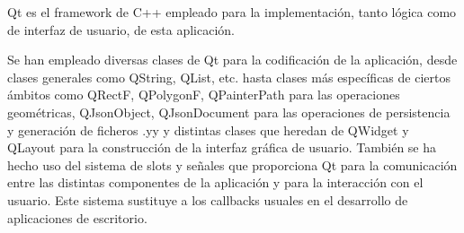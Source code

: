 Qt\cite{qt1}\cite{qt2}\cite{qtDoc} es el framework de C++ empleado para la implementación, tanto lógica como de interfaz de usuario, de esta aplicación.

Se han empleado diversas clases de Qt para la codificación de la aplicación, desde clases generales como QString, QList, etc. hasta clases más específicas de ciertos ámbitos como QRectF, QPolygonF, QPainterPath para las operaciones geométricas, QJsonObject, QJsonDocument para las operaciones de persistencia y generación de ficheros .yy y distintas clases que heredan de QWidget y QLayout para la construcción de la interfaz gráfica de usuario.
También se ha hecho uso del sistema de slots y señales que proporciona Qt para la comunicación entre las distintas componentes de la aplicación y para la interacción con el usuario. Este sistema sustituye a los callbacks usuales en el desarrollo de aplicaciones de escritorio.